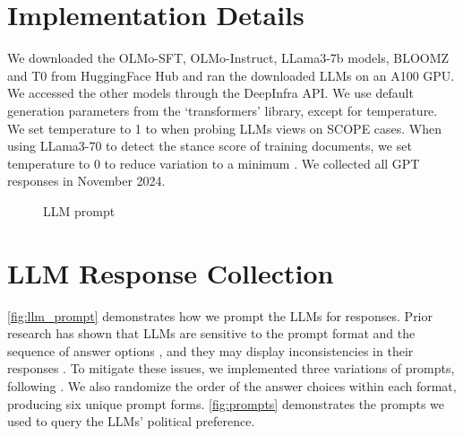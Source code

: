 \newpage
\appendix
\renewcommand{\arraystretch}{1}






\section{Implementation Details}
\label{app:implementation}
We downloaded the OLMo-SFT, OLMo-Instruct, LLama3-7b models, BLOOMZ and T0 from HuggingFace Hub \cite{wolf2020huggingfacestransformersstateoftheartnatural} and ran the downloaded LLMs on an A100 GPU. We accessed the other models through the DeepInfra API.  We use default generation parameters from the `transformers' library, except for temperature. We set temperature to 1 to when probing LLMs views on SCOPE cases. When using LLama3-70 to detect the stance score of training documents, we set temperature to 0 to reduce variation to a minimum . We collected all GPT responses in November 2024.


\begin{figure*}[h]
\centering
{}
\caption{LLM prompt}
\label{fig:llm_prompt}
\end{figure*}


\section{LLM Response Collection}
\label{app:prompts}

\autoref{fig:llm_prompt} demonstrates how we prompt the LLMs for responses. 
Prior research has shown that LLMs are sensitive to the prompt format and the sequence of answer options \cite{webson-pavlick-2022-prompt}, and they may display inconsistencies in their responses \cite{elazar-etal-2021-measuring}. To mitigate these issues, we implemented three variations of prompts, following \citet{NEURIPS2023_a2cf225b}. We also randomize the order of the answer choices within each format, producing six unique prompt forms.
\autoref{fig:prompts} demonstrates the prompts we used to query the LLMs' political preference.


